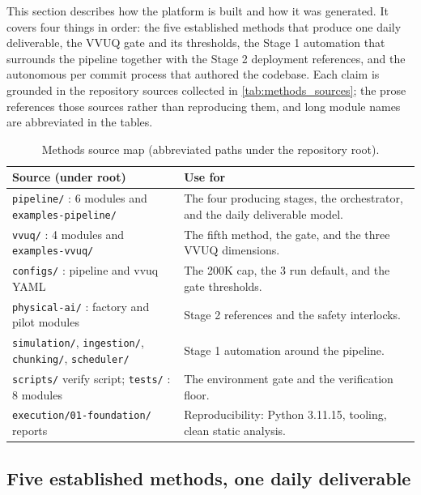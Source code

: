 
This section describes how the platform is built and how it was generated. It
covers four things in order: the five established methods that produce one daily
deliverable, the VVUQ gate and its thresholds, the Stage 1 automation that
surrounds the pipeline together with the Stage 2 deployment references, and the
autonomous per commit process that authored the codebase. Each claim is grounded
in the repository sources collected in \autoref{tab:methods_sources}; the prose
references those sources rather than reproducing them, and long module names are
abbreviated in the tables.

\begin{table}[H]
\caption{Methods source map (abbreviated paths under the repository root).}
\label{tab:methods_sources}
\centering
\begin{tabularx}{\textwidth}{L{4.8cm} >{\raggedright\arraybackslash}X}
\toprule
\textbf{Source (under root)} & \textbf{Use for} \\
\midrule
  \texttt{pipeline/} : 6 modules and \texttt{examples-pipeline/} & The four producing stages, the orchestrator, and the daily deliverable model. \\
  \texttt{vvuq/} : 4 modules and \texttt{examples-vvuq/} & The fifth method, the gate, and the three VVUQ dimensions. \\
  \texttt{configs/} : pipeline and vvuq YAML & The 200K cap, the 3 run default, and the gate thresholds. \\
  \texttt{physical-ai/} : factory and pilot modules & Stage 2 references and the safety interlocks. \\
  \texttt{simulation/}, \texttt{ingestion/}, \texttt{chunking/}, \texttt{scheduler/} & Stage 1 automation around the pipeline. \\
  \texttt{scripts/} verify script; \texttt{tests/} : 8 modules & The environment gate and the verification floor. \\
  \texttt{execution/01-foundation/} reports & Reproducibility: Python 3.11.15, tooling, clean static analysis. \\
\bottomrule
\end{tabularx}
\end{table}

\subsection{Five established methods, one daily deliverable}

